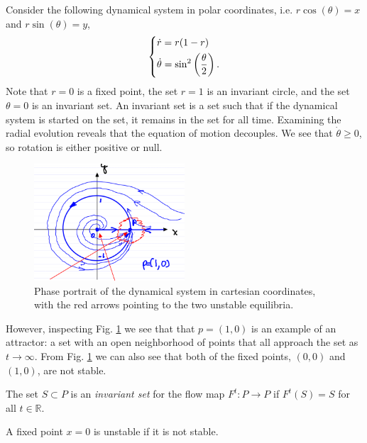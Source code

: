\begin{ex}[]
	Consider the following dynamical system in polar coordinates, i.e. $r\cos(\theta) = x$ and $r \sin(\theta) = y$,
	\begin{align}
		\begin{dcases}
			\dot{r} = r(1-r) \\ \dot{\theta} = \sin^2\left( \frac{\theta}{2} \right).
		\end{dcases}
	\end{align}
	Note that $r=0$ is a fixed point, the set $r=1$ is an invariant circle, and the set $\theta=0$ is an invariant set. An invariant set is a set such that if the dynamical system is started on the set, it remains in the set for all time. Examining the radial evolution reveals that the equation of motion decouples. We see that $\dot{\theta}\geq 0$, so rotation is either positive or null.
	\begin{figure}[h!]
		\centering
		\includegraphics[width=0.5\textwidth]{figures/ch2/5polar_cds.png}
		\caption{Phase portrait of the dynamical system in cartesian coordinates, with the red arrows pointing to the two unstable equilibria.}
		\label{fig:polar_attractor}
	\end{figure}

	However, inspecting Fig. \ref{fig:polar_attractor} we see that that $p=(1,0)$ is an example of an attractor: a set with an open neighborhood of points that all approach the set as $t\to \infty $. From Fig. \ref{fig:polar_attractor} we can also see that both of the fixed points, $(0,0)$ and $(1,0)$, are not stable.
\end{ex}

\begin{definition}
	The set $S \subset P$ is an \emph{invariant set} for the flow map $F^{t}:P \to P$ if $F^{t}(S) =S$ for all $t \in \mathbb{R}$.
\end{definition}

\begin{definition}
	A fixed point $ {x}=0$ is unstable if it is not stable.
\end{definition}

